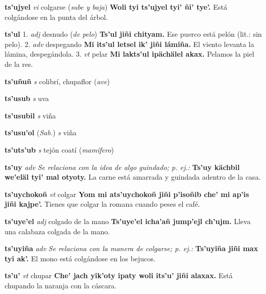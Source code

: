 \documentclass[10pt]{scrbook}
\newcommand{\entry}[1]{\textbf{#1}}
\newcommand{\onedefinition}[1]{#1.}
\newcommand{\nontranslationdef}[1]{\textit{#1}}
\newcommand{\partofspeech}[1]{\textit{#1}}
\newcommand{\spanishtranslation}[1]{#1}
\newcommand{\clarification}[1]{(\textit{#1})}
\newcommand{\cholexample}[1]{\textbf{#1}}
\newcommand{\exampletranslation}[1]{#1}
\newcommand{\relevantdialect}[1]{(\textit{#1})}
\begin{document}
\begin{multicols}{2}
\entry{ts'ujyel}
\partofspeech{vi}
\spanishtranslation{colgarse}
\clarification{sube y baja}
\cholexample{Woli tyi ts'ujyel tyi' ñi' tye'.}
\exampletranslation{Está colgándose en la punta del árbol.}

\entry{ts'ul}
\onedefinition{1}
\partofspeech{adj}
\spanishtranslation{desnudo}
\clarification{de pelo}
\cholexample{Ts'ul jiñi chityam.}
\exampletranslation{Ese puerco está pelón (lit.: sin pelo).}
\onedefinition{2}
\partofspeech{adv}
\spanishtranslation{despegando}
\cholexample{Mi its'ul letsel ik' jiñi lámiña.}
\exampletranslation{El viento levanta la lámina, despegándola.}
\onedefinition{3}
\partofspeech{vt}
\spanishtranslation{pelar}
\cholexample{Mi lakts'ul ipächälel akax.}
\exampletranslation{Pelamos la piel de la res.}

\entry{ts'uñuñ}
\partofspeech{s}
\spanishtranslation{colibrí, chupaflor}
\clarification{ave}

\entry{ts'usub}
\partofspeech{s}
\spanishtranslation{uva}

\entry{ts'usubil}
\partofspeech{s}
\spanishtranslation{viña}

\entry{ts'usu'ol}
\relevantdialect{Sab.}
\partofspeech{s}
\spanishtranslation{viña}

\entry{ts'uts'ub}
\partofspeech{s}
\spanishtranslation{tejón}
\spanishtranslation{coatí}
\clarification{mamífero}

\entry{ts'uy}
\partofspeech{adv}
\nontranslationdef{Se relaciona con la idea de algo guindado; p. ej.:}
\cholexample{Ts'uy kächbil we'eläl tyi' mal otyoty.}
\exampletranslation{La carne está amarrada y guindada adentro de la casa.}

\entry{ts'uychokoñ}
\partofspeech{vt}
\spanishtranslation{colgar}
\cholexample{Yom mi ats'uychokoñ jiñi p'isoñib che' mi ap'is jiñi kajpe'.}
\exampletranslation{Tienes que colgar la romana cuando peses el café.}

\entry{ts'uye'el}
\partofspeech{adj}
\spanishtranslation{colgado de la mano}
\cholexample{Ts'uye'el icha'añ jump'ejl ch'ujm.}
\exampletranslation{Lleva una calabaza colgada de la mano.}

\entry{ts'uyiña}
\partofspeech{adv}
\nontranslationdef{Se relaciona con la manera de colgarse; p. ej.:}
\cholexample{Ts'uyiña jiñi max tyi ak'.}
\exampletranslation{El mono está colgándose en los bejucos.}

\entry{ts'u'}
\partofspeech{vt}
\spanishtranslation{chupar}
\cholexample{Che' jach yik'oty ipaty woli its'u' jiñi alaxax.}
\exampletranslation{Está chupando la naranja con la cáscara.}


\end{multicols}
\end{document}
